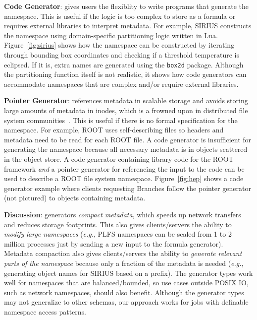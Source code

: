 \textbf{Code Generator}: gives users the flexiblity to write programs that
generate the namespace. This is useful if the logic is too complex to store as
a formula or requires external libraries to interpret metadata. For example,
SIRIUS constructs the namespace using domain-specific partitioning logic
written in Lua.  Figure~\ref{fig:sirius} shows how the namespace can be
constructed by iterating through  bounding box coordinates and checking if a
threshold temperature is eclipsed. If it is, extra names are generated using
the \texttt{box2d} package.  Although the partitioning function itself is not
realistic, it shows how code generators can accommodate namespaces that are
complex and/or require external libraries.  

\textbf{Pointer Generator}: references metadata in scalable storage and avoids
storing large amounts of metadata in inodes, which is a frowned upon in
distributed file system communities~\cite{docs:cephinternals}. This is useful
if there is no formal specification for the namespace. For example, ROOT uses
self-describing files so headers and metadata need to be read for each ROOT
file. A code generator is insufficient for generating the namespace because all
necessary metadata is in objects scattered in the object store.  A code
generator containing library code for the ROOT framework \emph{and} a pointer
generator for referencing the input to the code can be used to describe a ROOT
file system namespace.  Figure~\ref{fig:hep} shows a code generator example
where clients requesting Branches follow the pointer generator (not pictured)
to objects containing metadata. 


\textbf{Discussion}: generators \emph{compact metadata}, which speeds up
network transfers and reduces storage footprints. This also gives
clients/servers the ability to \emph{modify large namespaces} ({\it e.g.}, PLFS
namespaces can be scaled from 1 to 2 million processes just by sending a new
input to the formula generator). Metadata compaction also gives clients/servers
the ability to \emph{generate relevant parts of the namespace} because only a
fraction of the metadata is needed ({\it e.g.}, generating object names for
SIRIUS based on a prefix).  The generator types work well for namespaces that
are balanced/bounded, so use cases outside POSIX IO, such as network
namespaces, should also benefit.  Although the generator types may not
generalize to other schemas, our approach works for jobs with definable
namespace access patterns.  

